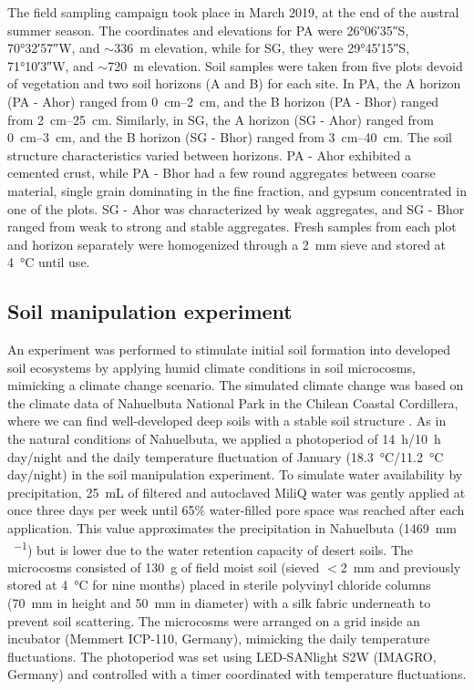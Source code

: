 The field sampling campaign took place in March 2019, at the end of the austral summer season. The coordinates and elevations for PA were \ang{26;06;35}S, \ang{70;32;57}W, and \(\sim\)\SI{336}{\meter} elevation, while for SG, they were \ang{29;45;15}S, \ang{71;10;3}W, and \(\sim\)\SI{720}{\meter} elevation. Soil samples were taken from five plots devoid of vegetation and two soil horizons (A and B) for each site. In PA, the A horizon (PA - Ahor) ranged from \SIrange{0}{2}{\centi\metre}, and the B horizon (PA - Bhor) ranged from \SIrange{2}{25}{\centi\metre}. Similarly, in SG, the A horizon (SG - Ahor) ranged from \SIrange{0}{3}{\centi\metre}, and the B horizon (SG - Bhor) ranged from \SIrange{3}{40}{\centi\metre}. The soil structure characteristics varied between horizons. PA - Ahor exhibited a cemented crust, while PA - Bhor had a few round aggregates between coarse material, single grain dominating in the fine fraction, and gypsum concentrated in one of the plots. SG - Ahor was characterized by weak aggregates, and SG - Bhor ranged from weak to strong and stable aggregates. Fresh samples from each plot and horizon separately were homogenized through a \SI{2}{\milli\metre} sieve and stored at \SI{4}{\degreeCelsius} until use.

\subsection{Soil manipulation experiment}

An experiment was performed to stimulate initial soil formation into developed soil ecosystems by applying humid climate conditions in soil microcosms, mimicking a climate change scenario. The simulated climate change was based on the climate data of Nahuelbuta National Park in the Chilean Coastal Cordillera, where we can find well-developed deep soils with a stable soil structure \citep{Bernhard2018, RiverasMunoz2022}. As in the natural conditions of Nahuelbuta, we applied a photoperiod of \SI{14}{\hour}/\SI{10}{\hour} day/night and the daily temperature fluctuation of January (\SI{18.3}{\degreeCelsius}/\SI{11.2}{\degreeCelsius} day/night) in the soil manipulation experiment. To simulate water availability by precipitation, \SI{25}{\milli\liter} of filtered and autoclaved MiliQ water was gently applied at once three days per week until 65\% water-filled pore space was reached after each application. This value approximates the precipitation in Nahuelbuta (\SI{1469}{\milli\metre\,\year^{-1}}) but is lower due to the water retention capacity of desert soils. The microcosms consisted of \SI{130}{\gram} of field moist soil (sieved $<$\SI{2}{\milli\metre} and previously stored at \SI{4}{\degreeCelsius} for nine months) placed in sterile polyvinyl chloride columns (\SI{70}{\milli\metre} in height and \SI{50}{\milli\metre} in diameter) with a silk fabric underneath to prevent soil scattering. The microcosms were arranged on a grid inside an incubator (Memmert ICP-110, Germany), mimicking the daily temperature fluctuations. The photoperiod was set using LED-SANlight S2W (IMAGRO, Germany) and controlled with a timer coordinated with temperature fluctuations.

